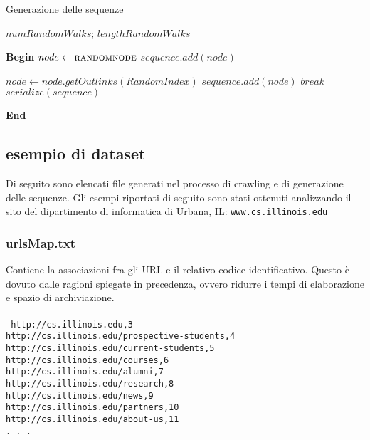 \begin{algorithm}[H]
\caption{Generazione delle sequenze}
\begin{algorithmic}

	\State $numRandomWalks$;	
	\State $lengthRandomWalks$ 
 	
 	\vspace*{+0.5cm}
 	
	\State \textbf{Begin}
	\State $node \gets \Call{randomnode}{}$
		\State $sequence.add(node)$
		
				\State $node \gets node.getOutlinks(RandomIndex)$
				\State $sequence.add(node)$
			\Else
				\State $break$
			\EndIf
		\EndWhile
		\State $serialize(sequence)$
		
	\EndFor
	\State \textbf{End}
\end{algorithmic}
\end{algorithm}


\subsection{esempio di dataset}
Di seguito sono elencati file generati nel processo di crawling e di generazione delle sequenze. Gli esempi riportati di seguito sono stati ottenuti analizzando il sito del dipartimento di informatica di Urbana, IL: \texttt{www.cs.illinois.edu}

\subsubsection{urlsMap.txt}
Contiene la associazioni fra gli URL e il relativo codice identificativo. Questo è dovuto dalle ragioni spiegate in precedenza, ovvero ridurre i tempi di elaborazione e spazio di archiviazione. 
\\\\
\texttt{
http://cs.illinois.edu,3\\
http://cs.illinois.edu/prospective-students,4\\
http://cs.illinois.edu/current-students,5\\
http://cs.illinois.edu/courses,6\\
http://cs.illinois.edu/alumni,7\\
http://cs.illinois.edu/research,8\\
http://cs.illinois.edu/news,9\\
http://cs.illinois.edu/partners,10\\
http://cs.illinois.edu/about-us,11\\
. . .\\
}
